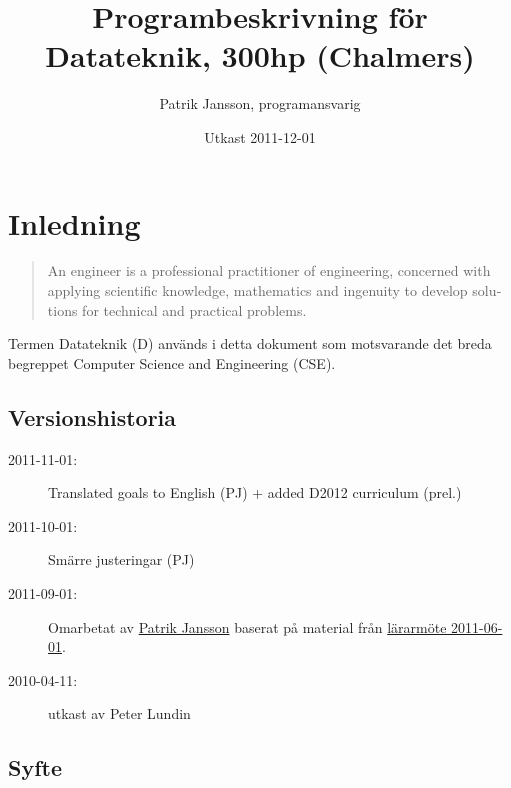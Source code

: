 \documentclass[twocolumn]{article}
\title{Programbeskrivning för Datateknik, 300hp (Chalmers)}
\author{Patrik Jansson, programansvarig}
\date{Utkast 2011-12-01}
\begin{document}
\maketitle
\section{Inledning}

\begin{quote}
  \foreignlanguage{british}{An engineer is a professional practitioner
    of engineering, concerned with applying scientific knowledge,
    mathematics and ingenuity to develop solutions for technical and
    practical problems. }
\end{quote}

Termen Datateknik (D) används i detta dokument som motsvarande det
breda begreppet \foreignlanguage{british}{Computer Science and
  Engineering (CSE)}.

\subsection*{Versionshistoria}
{\small
\begin{description}
\item[2011-11-01:] Translated goals to English (PJ) + added D2012 curriculum (prel.)
\item[2011-10-01:] Smärre justeringar (PJ)
\item[2011-09-01:] Omarbetat av \href{http://www.chalmers.se/cse/EN/people/jansson-patrik}{Patrik Jansson} baserat på material från 
\href{http://wiki.portal.chalmers.se/cse/pmwiki.php/PAD/L%C3%A4rarm%C3%B6teVT2011}{lärarmöte 2011-06-01}.
\item[2010-04-11:] utkast av Peter Lundin
\end{description}
}

\subsection{Syfte} 
\end{document}
